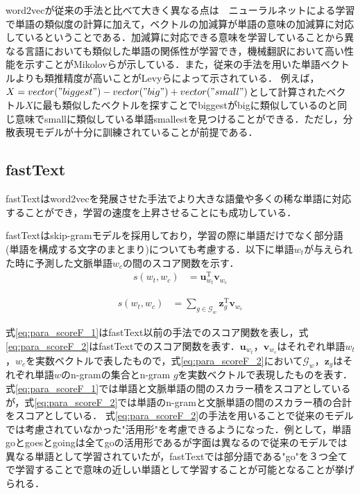word2vecが従来の手法と比べて大きく異なる点は　ニューラルネットによる学習で単語の類似度の計算に加えて，ベクトルの加減算が単語の意味の加減算に対応しているということである．加減算に対応できる意味を学習していることから異なる言語においても類似した単語の関係性が学習でき，機械翻訳において高い性能を示すことがMikolovら\cite{w2vTranslate}が示している．また，従来の手法を用いた単語ベクトルよりも類推精度が高いことがLevyら\cite{levy2014neural}によって示されている．
例えば，$X=vector("biggest") - vector("big") + vector("small")$として計算されたベクトル$X$に最も類似したベクトルを探すことでbiggestがbigに類似しているのと同じ意味でsmallに類似している単語smallestを見つけることができる．ただし，分散表現モデルが十分に訓練されていることが前提である．

\subsection{fastText}
fastText\cite{fastText}\cite{fastText2}はword2vecを発展させた手法でより大きな語彙や多くの稀な単語に対応することができ，学習の速度を上昇させることにも成功している．

fastTextはskip-gramモデルを採用しており，学習の際に単語だけでなく部分語(単語を構成する文字のまとまり)についても考慮する．以下に単語$w_t$が与えられた時に予測した文脈単語$w_c$の間のスコア関数を示す．
\begin{equation}
\begin{aligned}
\label{eq:para_scoreF_1}
s(w_t , w_c) & = \bm{ u }^{\mathrm{T}}_{w_t} \bm{v}_{w_c}
\end{aligned}
\end{equation}

\begin{equation}
\begin{aligned}
\label{eq:para_scoreF_2}
s(w_t , w_c) & =  \sum_{g \in \mathcal{G}_w} \bm{ z }^{\mathrm{T}}_{g} \bm{v}_{w_c}
\end{aligned}
\end{equation}

式\ref{eq:para_scoreF_1}はfastText以前の手法でのスコア関数を表し，式\ref{eq:para_scoreF_2}はfastTextでのスコア関数を表す．$\bm{u}_{w_{t}}$，$\bm{v}_{w_c}$はそれぞれ単語$w_t$，$w_c$を実数ベクトルで表したもので，式\ref{eq:para_scoreF_2}において$\mathcal{G}_w$，$\bm{z}_{g}$はそれぞれ単語$w$のn-gramの集合とn-gram $g$を実数ベクトルで表現したものを表す．
式\ref{eq:para_scoreF_1}では単語と文脈単語の間のスカラー積をスコアとしているが，式\ref{eq:para_scoreF_2}では単語のn-gramと文脈単語の間のスカラー積の合計をスコアとしている．
式\ref{eq:para_scoreF_2}の手法を用いることで従来のモデルでは考慮されていなかった"活用形"を考慮できるようになった．例として，単語 goとgoesとgoingは全てgoの活用形であるが字面は異なるので従来のモデルでは異なる単語として学習されていたが，fastTextでは部分語である"go"を３つ全てで学習することで意味の近しい単語として学習することが可能となることが挙げられる．

